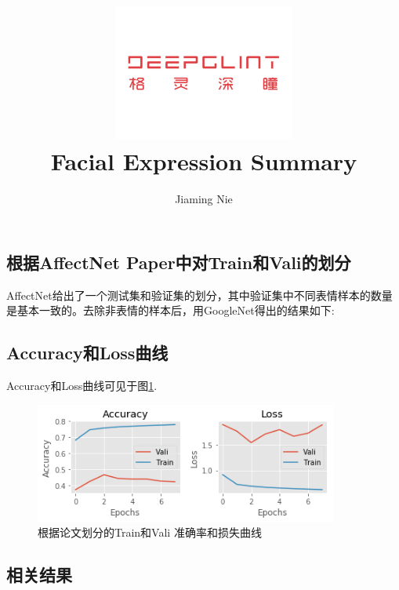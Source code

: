 \documentclass[11pt, a4paper]{article}
\title{\includegraphics[width=0.45\textwidth]{dg}
        \\Facial Expression Summary   }          %
\author{Jiaming Nie}                    %
\begin{document}
\begin{titlepage}
	
\maketitle
{}

\thispagestyle{empty}  %

\end{titlepage}




\begin{CJK}{UTF8}{gbsn}

\section{根据AffectNet Paper中对Train和Vali的划分}

AffectNet给出了一个测试集和验证集的划分，其中验证集中不同表情样本的数量是基本一致的。去除非表情的样本后，用GoogleNet得出的结果如下:

\subsection{Accuracy和Loss曲线}

Accuracy和Loss曲线可见于图\ref{fig:accuLoss}.

\begin{figure}[htbp]
	\centering %
	\includegraphics[width=10cm]{accuLoss}
	\caption{根据论文划分的Train和Vali 准确率和损失曲线}
	\label{fig:accuLoss}
\end{figure}

\subsection{相关结果}


\end{CJK}
\end{document}
